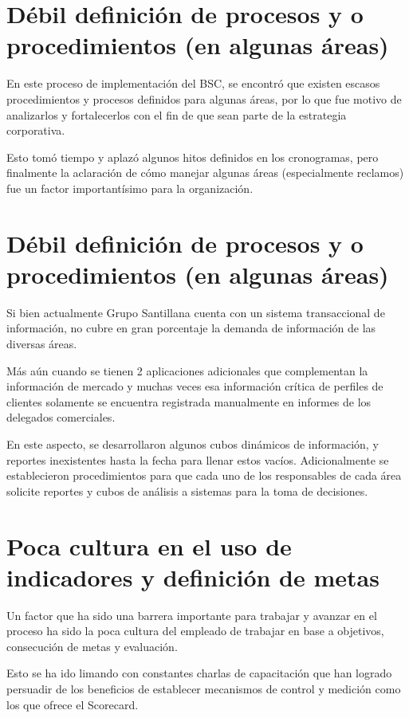 \section{Débil definición de procesos y o procedimientos (en algunas áreas)}
\item {En este proceso de implementación del BSC, se encontró que existen escasos procedimientos y procesos definidos para algunas áreas, por lo que fue motivo de analizarlos y fortalecerlos con el fin de que sean parte de la estrategia corporativa.

Esto tomó tiempo y aplazó algunos hitos definidos en los cronogramas, pero finalmente la aclaración de cómo manejar algunas áreas (especialmente reclamos) fue un factor importantísimo para la organización.}

\section{Débil definición de procesos y o procedimientos (en algunas áreas)}
\item {Si bien actualmente Grupo Santillana cuenta con un sistema transaccional de información, no cubre en gran porcentaje la demanda de información de las diversas áreas.

Más aún cuando se tienen 2 aplicaciones adicionales que complementan la información de mercado y muchas veces esa información crítica de perfiles de clientes solamente se encuentra registrada manualmente en informes de los delegados comerciales.

En este aspecto, se desarrollaron algunos cubos dinámicos de información, y reportes inexistentes hasta la fecha para llenar estos vacíos. Adicionalmente se establecieron procedimientos para que cada uno de los responsables de cada área solicite reportes y cubos de análisis a sistemas para la toma de decisiones.}


\section{Poca cultura en el uso de indicadores y definición de metas}
\item {Un factor que ha sido una barrera importante para trabajar y avanzar en el proceso ha sido la poca cultura del empleado de trabajar en base a objetivos, consecución de metas y evaluación.

Esto se ha ido limando con constantes charlas de capacitación que han logrado persuadir de los beneficios de establecer mecanismos de control y medición como los que ofrece el Scorecard.}

